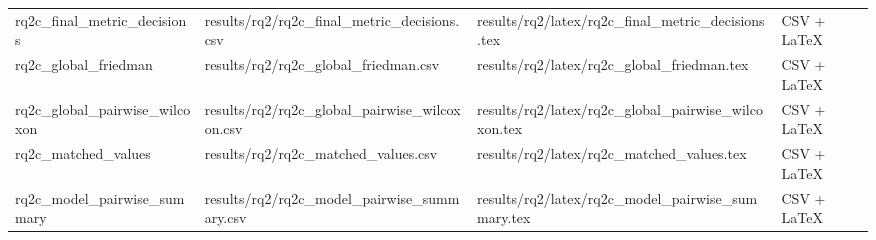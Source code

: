 \begin{table}[tbp]
\begin{tabular}{llll}
rq2c\_final\_metric\_decisions & results/rq2/rq2c\_final\_metric\_decisions.csv & results/rq2/latex/rq2c\_final\_metric\_decisions.tex & CSV + LaTeX \\
rq2c\_global\_friedman & results/rq2/rq2c\_global\_friedman.csv & results/rq2/latex/rq2c\_global\_friedman.tex & CSV + LaTeX \\
rq2c\_global\_pairwise\_wilcoxon & results/rq2/rq2c\_global\_pairwise\_wilcoxon.csv & results/rq2/latex/rq2c\_global\_pairwise\_wilcoxon.tex & CSV + LaTeX \\
rq2c\_matched\_values & results/rq2/rq2c\_matched\_values.csv & results/rq2/latex/rq2c\_matched\_values.tex & CSV + LaTeX \\
rq2c\_model\_pairwise\_summary & results/rq2/rq2c\_model\_pairwise\_summary.csv & results/rq2/latex/rq2c\_model\_pairwise\_summary.tex & CSV + LaTeX \\
\bottomrule
\end{tabular}
\end{table}
